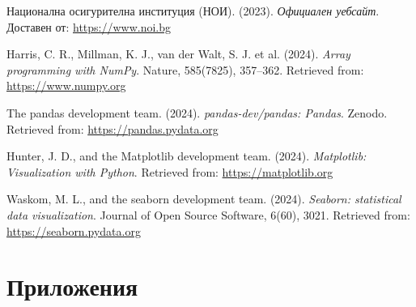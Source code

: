 \documentclass[a4paper,12pt]{article}
\begin{document}
\begin{thebibliography}{99}
        Национална осигурителна институция (НОИ). (2023).
        \emph{Официален уебсайт}.
        Доставен от: \url{https://www.noi.bg}

        Harris, C. R., Millman, K. J., van der Walt, S. J. et al. (2024).
        \emph{Array programming with NumPy}.
        Nature, 585(7825), 357–362.
        Retrieved from: \url{https://www.numpy.org}

        The pandas development team. (2024).
        \emph{pandas-dev/pandas: Pandas}.
        Zenodo.
        Retrieved from: \url{https://pandas.pydata.org}

        Hunter, J. D., and the Matplotlib development team. (2024).
        \emph{Matplotlib: Visualization with Python}.
        Retrieved from: \url{https://matplotlib.org}

        Waskom, M. L., and the seaborn development team. (2024).
        \emph{Seaborn: statistical data visualization}.
        Journal of Open Source Software, 6(60), 3021.
        Retrieved from: \url{https://seaborn.pydata.org}
\end{thebibliography}
\newpage
\section{Приложения}





\end{document}
